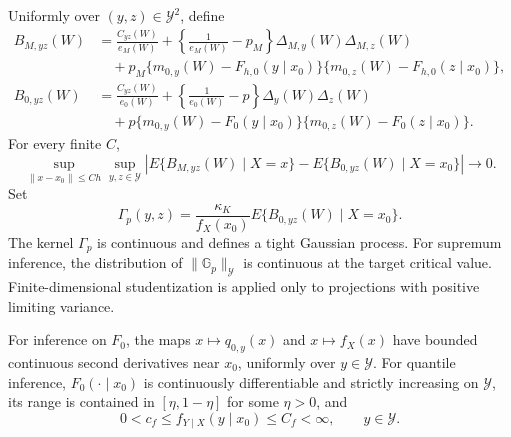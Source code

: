 \begin{assumption}
\label{cond:covariance}
Uniformly over \((y,z)\in\mathcal Y^2\), define
\begin{align*}
B_{M,yz}(W)
&=
\frac{C_{yz}(W)}{e_M(W)}
+
\left\{\frac1{e_M(W)}-p_M\right\}
\Delta_{M,y}(W)\Delta_{M,z}(W)\\
&\quad+
p_M\{m_{0,y}(W)-F_{h,0}(y\mid x_0)\}
   \{m_{0,z}(W)-F_{h,0}(z\mid x_0)\},\\
B_{0,yz}(W)
&=
\frac{C_{yz}(W)}{e_0(W)}
+
\left\{\frac1{e_0(W)}-p\right\}
\Delta_y(W)\Delta_z(W)\\
&\quad+
p\{m_{0,y}(W)-F_0(y\mid x_0)\}
   \{m_{0,z}(W)-F_0(z\mid x_0)\}.
\end{align*}
For every finite \(C\),
\begin{equation}
\sup_{\|x-x_0\|\le Ch}\sup_{y,z\in\mathcal Y}
\left|
E\{B_{M,yz}(W)\mid X=x\}
-
E\{B_{0,yz}(W)\mid X=x_0\}
\right|
\to0.
\label{eq:cov-local-convergence}
\end{equation}
Set
\begin{equation}
\Gamma_p(y,z)
=
\frac{\kappa_K}{f_X(x_0)}
E\{B_{0,yz}(W)\mid X=x_0\}.
\label{eq:gamma-assumption}
\end{equation}
The kernel \(\Gamma_p\) is continuous and defines a tight Gaussian process. For supremum inference, the distribution of \(\|\mathbb G_p\|_{\mathcal Y}\) is continuous at the target critical value. Finite-dimensional studentization is applied only to projections with positive limiting variance.
\end{assumption}

\begin{assumption}
\label{cond:bias}
For inference on \(F_0\), the maps \(x\mapsto q_{0,y}(x)\) and \(x\mapsto f_X(x)\) have bounded continuous second derivatives near \(x_0\), uniformly over \(y\in\mathcal Y\). For quantile inference, \(F_0(\cdot\mid x_0)\) is continuously differentiable and strictly increasing on \(\mathcal Y\), its range is contained in \([\eta,1-\eta]\) for some \(\eta>0\), and
\[
0<c_f
\le
f_{Y\mid X}(y\mid x_0)
\le C_f<\infty,
\qquad y\in\mathcal Y.
\]
\end{assumption}

